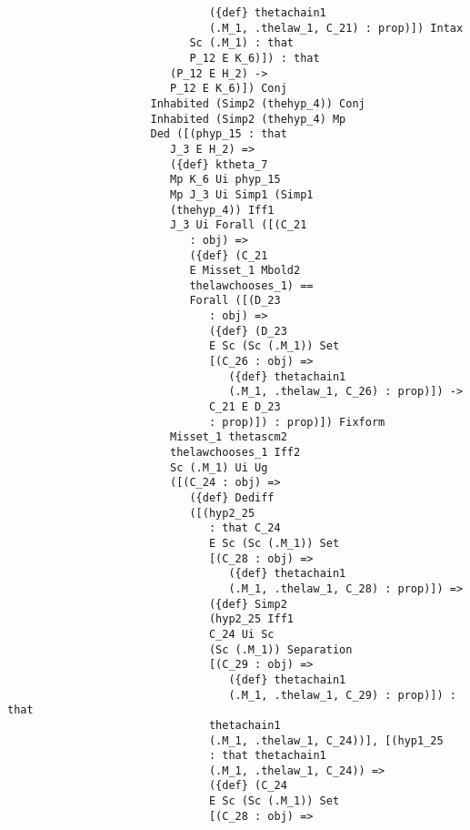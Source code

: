 \documentclass[12pt]{article}
\begin{document}
\begin{verbatim}
                               ({def} thetachain1 
                               (.M_1, .thelaw_1, C_21) : prop)]) Intax 
                            Sc (.M_1) : that 
                            P_12 E K_6)]) : that 
                         (P_12 E H_2) -> 
                         P_12 E K_6)]) Conj 
                      Inhabited (Simp2 (thehyp_4)) Conj 
                      Inhabited (Simp2 (thehyp_4) Mp 
                      Ded ([(phyp_15 : that 
                         J_3 E H_2) => 
                         ({def} ktheta_7 
                         Mp K_6 Ui phyp_15 
                         Mp J_3 Ui Simp1 (Simp1 
                         (thehyp_4)) Iff1 
                         J_3 Ui Forall ([(C_21 
                            : obj) => 
                            ({def} (C_21 
                            E Misset_1 Mbold2 
                            thelawchooses_1) == 
                            Forall ([(D_23 
                               : obj) => 
                               ({def} (D_23 
                               E Sc (Sc (.M_1)) Set 
                               [(C_26 : obj) => 
                                  ({def} thetachain1 
                                  (.M_1, .thelaw_1, C_26) : prop)]) -> 
                               C_21 E D_23 
                               : prop)]) : prop)]) Fixform 
                         Misset_1 thetascm2 
                         thelawchooses_1 Iff2 
                         Sc (.M_1) Ui Ug 
                         ([(C_24 : obj) => 
                            ({def} Dediff 
                            ([(hyp2_25 
                               : that C_24 
                               E Sc (Sc (.M_1)) Set 
                               [(C_28 : obj) => 
                                  ({def} thetachain1 
                                  (.M_1, .thelaw_1, C_28) : prop)]) => 
                               ({def} Simp2 
                               (hyp2_25 Iff1 
                               C_24 Ui Sc 
                               (Sc (.M_1)) Separation 
                               [(C_29 : obj) => 
                                  ({def} thetachain1 
                                  (.M_1, .thelaw_1, C_29) : prop)]) : that 
                               thetachain1 
                               (.M_1, .thelaw_1, C_24))], [(hyp1_25 
                               : that thetachain1 
                               (.M_1, .thelaw_1, C_24)) => 
                               ({def} (C_24 
                               E Sc (Sc (.M_1)) Set 
                               [(C_28 : obj) => 

\end{verbatim}
\end{document}
